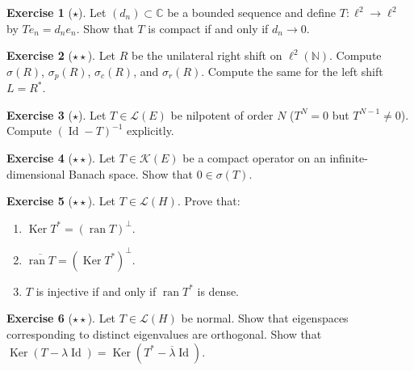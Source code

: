 \documentclass[a4paper,12pt]{book}
\DeclareMathOperator{\Id}{Id}
\DeclareMathOperator{\Ker}{Ker}
\DeclareMathOperator{\ran}{ran}
\newcommand{\N}{\mathbb{N}}
\newcommand{\C}{\mathbb{C}}
\theoremstyle{definition}
\newtheorem{exercise}{Exercise}[chapter]
\theoremstyle{plain}
\theoremstyle{remark}
\begin{document}
\begin{exercise}[$\star$]\label{exo:compact-diagonal}
Let $(d_n)\subset\C$ be a bounded sequence and define $T\colon\ell^2\to\ell^2$
by $T e_n = d_n e_n$. Show that $T$ is compact if and only if $d_n\to 0$.
\end{exercise}

\begin{exercise}[$\star\star$]\label{exo:spectrum-shift}
Let $R$ be the unilateral right shift on $\ell^2(\N)$. Compute $\sigma(R)$,
$\sigma_p(R)$, $\sigma_c(R)$, and $\sigma_r(R)$. Compute the same for the
left shift $L=R^*$.
\end{exercise}

\begin{exercise}[$\star$]\label{exo:neumann-application}
Let $T\in\mathcal{L}(E)$ be nilpotent of order $N$ ($T^N=0$ but $T^{N-1}\neq 0$).
Compute $(\Id-T)^{-1}$ explicitly.
\end{exercise}

\begin{exercise}[$\star\star$]\label{exo:spectral-radius-compact}
Let $T\in\mathcal{K}(E)$ be a compact operator on an infinite-dimensional Banach
space. Show that $0\in\sigma(T)$.
\end{exercise}

\begin{exercise}[$\star\star$]\label{exo:adjoint-kernel-range}
Let $T\in\mathcal{L}(H)$. Prove that:
\begin{enumerate}[label=(\alph*)]
  \item $\Ker T^* = (\ran T)^\perp$.
  \item $\overline{\ran T} = (\Ker T^*)^\perp$.
  \item $T$ is injective if and only if $\ran T^*$ is dense.
\end{enumerate}
\end{exercise}

\begin{exercise}[$\star\star$]\label{exo:normal-eigenspaces}
Let $T\in\mathcal{L}(H)$ be normal. Show that eigenspaces corresponding to
distinct eigenvalues are orthogonal. Show that $\Ker(T-\lambda\Id)=\Ker(T^*-\overline{\lambda}\Id)$.
\end{exercise}
\end{document}
